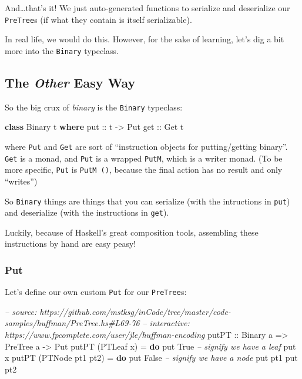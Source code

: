 \documentclass[]{article}
\newenvironment{Shaded}{}{}
\newcommand{\KeywordTok}[1]{\textcolor[rgb]{0.00,0.44,0.13}{\textbf{{#1}}}}
\newcommand{\DataTypeTok}[1]{\textcolor[rgb]{0.56,0.13,0.00}{{#1}}}
\newcommand{\CommentTok}[1]{\textcolor[rgb]{0.38,0.63,0.69}{\textit{{#1}}}}
\newcommand{\OtherTok}[1]{\textcolor[rgb]{0.00,0.44,0.13}{{#1}}}
\newcommand{\FunctionTok}[1]{\textcolor[rgb]{0.02,0.16,0.49}{{#1}}}
\newcommand{\NormalTok}[1]{{#1}}
\begin{document}
And\ldots{}that's it! We just auto-generated functions to serialize and
deserialize our \texttt{PreTree}s (if what they contain is itself
serializable).

In real life, we would do this. However, for the sake of learning, let's
dig a bit more into the \texttt{Binary} typeclass.

\subsection{\texorpdfstring{The \emph{Other} Easy
Way}{The Other Easy Way}}\label{the-other-easy-way}

So the big crux of \emph{binary} is the \texttt{Binary} typeclass:

\begin{Shaded}
\begin{Highlighting}[]
\KeywordTok{class} \DataTypeTok{Binary} \NormalTok{t }\KeywordTok{where}
\OtherTok{    put ::} \NormalTok{t }\OtherTok{->} \DataTypeTok{Put}
\OtherTok{    get ::} \DataTypeTok{Get} \NormalTok{t}
\end{Highlighting}
\end{Shaded}

where \texttt{Put} and \texttt{Get} are sort of ``instruction objects
for putting/getting binary''. \texttt{Get} is a monad, and \texttt{Put}
is a wrapped \texttt{PutM}, which is a writer monad. (To be more
specific, \texttt{Put} is \texttt{PutM\ ()}, because the final action
has no result and only ``writes'')

So \texttt{Binary} things are things that you can serialize (with the
intructions in \texttt{put}) and deserialize (with the instructions in
\texttt{get}).

Luckily, because of Haskell's great composition tools, assembling these
instructions by hand are easy peasy!

\subsubsection{Put}\label{put}

Let's define our own custom \texttt{Put} for our \texttt{PreTree}s:

\begin{Shaded}
\begin{Highlighting}[]
\CommentTok{-- source: https://github.com/mstksg/inCode/tree/master/code-samples/huffman/PreTree.hs#L69-76}
\CommentTok{-- interactive: https://www.fpcomplete.com/user/jle/huffman-encoding}
\OtherTok{putPT ::} \DataTypeTok{Binary} \NormalTok{a }\OtherTok{=>} \DataTypeTok{PreTree} \NormalTok{a }\OtherTok{->} \DataTypeTok{Put}
\NormalTok{putPT (}\DataTypeTok{PTLeaf} \NormalTok{x) }\FunctionTok{=} \KeywordTok{do}
    \NormalTok{put }\DataTypeTok{True}                    \CommentTok{-- signify we have a leaf}
    \NormalTok{put x}
\NormalTok{putPT (}\DataTypeTok{PTNode} \NormalTok{pt1 pt2) }\FunctionTok{=} \KeywordTok{do}
    \NormalTok{put }\DataTypeTok{False}                   \CommentTok{-- signify we have a node}
    \NormalTok{put pt1}
    \NormalTok{put pt2}
\end{Highlighting}
\end{Shaded}
\end{document}
